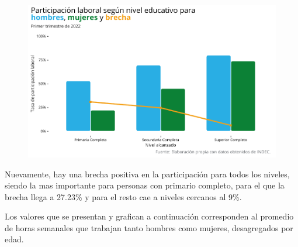 \documentclass[
]{article}
\begin{document}
\begin{figure}[htp]
\includegraphics{Informe-Mercado-Laboral_files/figure-latex/unnamed-chunk-15-1.pdf}
\caption{}
\end{figure}

\newpage

Nuevamente, hay una brecha positiva en la participación para todos los
niveles, siendo la mas importante para personas con primario completo,
para el que la brecha llega a 27.23\% y para el resto cae a niveles
cercanos al 9\%.

Los valores que se presentan y grafican a continuación corresponden al
promedio de horas semanales que trabajan tanto hombres como mujeres,
desagregados por edad.
\end{document}
